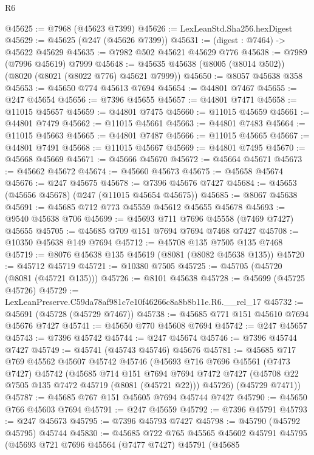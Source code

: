 \begin{lexlean}{R6}
\begin{coremodule}
@45625 := @7968 (@45623 @7399)
@45626 := LexLeanStd.Sha256.hexDigest
@45629 := @45625 (@247 (@45626 @7399))
@45631 := (digest : @7464) -> @45622 @45629
@45635 := @7982 @502 @45621 @45629 @776
@45638 := @7989 (@7996 @45619) @7999
@45648 := @45635 @45638 (@8005 (@8014 @502)) (@8020 (@8021 (@8022 @776) @45621 @7999))
@45650 := @8057 @45638 @358
@45653 := @45650 @774 @45613 @7694
@45654 := @44801 @7467
@45655 := @247 @45654
@45656 := @7396 @45655
@45657 := @44801 @7471
@45658 := @11015 @45657
@45659 := @44801 @7475
@45660 := @11015 @45659
@45661 := @44801 @7479
@45662 := @11015 @45661
@45663 := @44801 @7483
@45664 := @11015 @45663
@45665 := @44801 @7487
@45666 := @11015 @45665
@45667 := @44801 @7491
@45668 := @11015 @45667
@45669 := @44801 @7495
@45670 := @45668 @45669
@45671 := @45666 @45670
@45672 := @45664 @45671
@45673 := @45662 @45672
@45674 := @45660 @45673
@45675 := @45658 @45674
@45676 := @247 @45675
@45678 := @7396 @45676 @7427
@45684 := @45653 (@45656 @45678) (@247 (@11015 @45654 @45675))
@45685 := @8067 @45638
@45691 := @45685 @712 @773 @45559 @45612 @45655 @45678
@45693 := @9540 @45638 @706
@45699 := @45693 @711 @7696 @45558 (@7469 @7427) @45655
@45705 := @45685 @709 @151 @7694 @7694 @7468 @7427
@45708 := @10350 @45638 @149 @7694
@45712 := @45708 @135 @7505 @135 @7468
@45719 := @8076 @45638 @135 @45619 (@8081 (@8082 @45638 @135))
@45720 := @45712 @45719
@45721 := @10380 @7505
@45725 := @45705 (@45720 (@8081 (@45721 @135)))
@45726 := @8101 @45638
@45728 := @45699 (@45725 @45726)
@45729 := LexLeanPreserve.C59da78af981c7e10f46266c8a8b8b11e.R6.__rel_17
@45732 := @45691 (@45728 (@45729 @7467))
@45738 := @45685 @771 @151 @45610 @7694 @45676 @7427
@45741 := @45650 @770 @45608 @7694
@45742 := @247 @45657
@45743 := @7396 @45742
@45744 := @247 @45674
@45746 := @7396 @45744 @7427
@45749 := @45741 (@45743 @45746) @45676
@45781 := @45685
    @717
    @769
    @45562
    @45607
    @45742
    @45746
    (@45693
      @716
      @7696
      @45561
      (@7473 @7427)
      @45742
      (@45685
        @714
        @151
        @7694
        @7694
        @7472
        @7427
        (@45708 @22 @7505 @135 @7472 @45719 (@8081 (@45721 @22)))
        @45726)
      (@45729 @7471))
@45787 := @45685 @767 @151 @45605 @7694 @45744 @7427
@45790 := @45650 @766 @45603 @7694
@45791 := @247 @45659
@45792 := @7396 @45791
@45793 := @247 @45673
@45795 := @7396 @45793 @7427
@45798 := @45790 (@45792 @45795) @45744
@45830 := @45685
    @722
    @765
    @45565
    @45602
    @45791
    @45795
    (@45693
      @721
      @7696
      @45564
      (@7477 @7427)
      @45791
      (@45685

\end{coremodule}
\end{lexlean}
